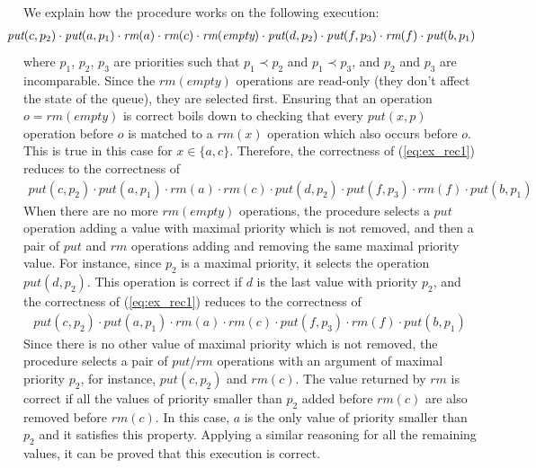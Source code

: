 We explain how the procedure works on the following execution:
{
\begin{align}
\hspace{-5mm}\textit{put}(c,p_2) \cdot \textit{put}(a,p_1) \cdot \textit{rm}(a) \cdot \textit{rm}(c) \cdot \textit{rm}(\textit{empty}) \cdot \textit{put}(d,p_2) \cdot \textit{put}(f,p_3) \cdot \textit{rm}(f) \cdot \textit{put}(b,p_1)\label{eq:ex_rec1}
\end{align}
}
where $p_1$, $p_2$, $p_3$ are priorities such that $p_1 \prec p_2$ and $p_1 \prec p_3$, and $p_2$ and $p_3$ are incomparable. Since the $\textit{rm}(\textit{empty})$ operations %
are read-only (they don't affect the state of the queue), they are selected first. Ensuring that an operation $o=\textit{rm}(\textit{empty})$ is correct boils down to checking that every $\textit{put}(x,p)$ operation before $o$ is matched to a $\textit{rm}(x)$ operation which also occurs before $o$. This is true in this case for $x\in \{a,c\}$. Therefore, the correctness of (\ref{eq:ex_rec1}) reduces to the correctness of
{
\begin{align*}
\textit{put}(c,p_2) \cdot \textit{put}(a,p_1) \cdot \textit{rm}(a) \cdot \textit{rm}(c) \cdot \textit{put}(d,p_2) \cdot \textit{put}(f,p_3) \cdot \textit{rm}(f) \cdot \textit{put}(b,p_1)
\end{align*}
}
When there are no more $\textit{rm}(\textit{empty})$ operations, the procedure selects a $\textit{put}$ operation adding a value with maximal priority which is not removed, and then a pair of $\textit{put}$ and $\textit{rm}$ operations adding and removing the same maximal priority value. For instance, since $p_2$ is a maximal priority, it selects the operation $\textit{put}(d,p_2)$. {This operation is correct if $d$ is the last value with priority $p_2$, and the correctness of (\ref{eq:ex_rec1}) reduces to the correctness of
{
\begin{align*}
\textit{put}(c,p_2) \cdot \textit{put}(a,p_1) \cdot \textit{rm}(a) \cdot \textit{rm}(c) \cdot \textit{put}(f,p_3) \cdot \textit{rm}(f) \cdot \textit{put}(b,p_1)
\end{align*}
}
Since there is no other value of maximal priority which is not removed, the procedure selects a pair of $\textit{put}$/$\textit{rm}$ operations with an argument of maximal priority $p_2$,} for instance, $\textit{put}(c,p_2)$ and $\textit{rm}(c)$. The value returned by $\textit{rm}$ is correct if all the values of priority smaller than $p_2$ added before $\textit{rm}(c)$ are also removed before $\textit{rm}(c)$. In this case, $a$ is the only value of priority smaller than $p_2$ and it satisfies this property. Applying a similar reasoning for all the remaining values, it can be proved that this execution is correct.

